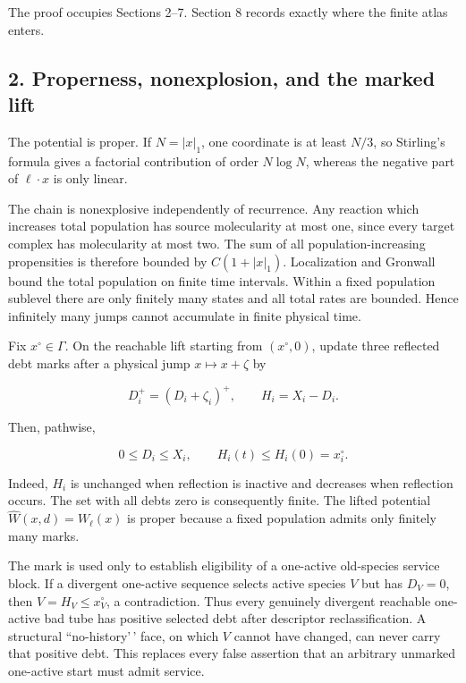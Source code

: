 The proof occupies Sections 2--7. Section 8 records exactly where the
finite atlas enters.

\subsection{2. Properness, nonexplosion, and the marked
lift}

The potential is proper. If \(N=|x|_1\), one coordinate is at least
\(N/3\), so Stirling's formula gives a factorial contribution of order
\(N\log N\), whereas the negative part of \(\ell\cdot x\) is only
linear.

The chain is nonexplosive independently of recurrence. Any reaction
which increases total population has source molecularity at most one,
since every target complex has molecularity at most two. The sum of all
population-increasing propensities is therefore bounded by
\(C(1+|x|_1)\). Localization and Gronwall bound the total population on
finite time intervals. Within a fixed population sublevel there are only
finitely many states and all total rates are bounded. Hence infinitely
many jumps cannot accumulate in finite physical time.

Fix \(x^\circ\in\Gamma\). On the reachable lift starting from
\((x^\circ,0)\), update three reflected debt marks after a physical jump
\(x\mapsto x+\zeta\) by

\[
 D_i^+=(D_i+\zeta_i)^+,
 \qquad H_i=X_i-D_i.                                  \tag{2.1}
\]

Then, pathwise,

\[
 0\le D_i\le X_i,
 \qquad H_i(t)\le H_i(0)=x_i^\circ.                  \tag{2.2}
\]

Indeed, \(H_i\) is unchanged when reflection is inactive and decreases
when reflection occurs. The set with all debts zero is consequently
finite. The lifted potential \(\widehat W(x,d)=W_\ell(x)\) is proper
because a fixed population admits only finitely many marks.

The mark is used only to establish eligibility of a one-active
old-species service block. If a divergent one-active sequence selects
active species \(V\) but has \(D_V=0\), then \(V=H_V\le x_V^\circ\), a
contradiction. Thus every genuinely divergent reachable one-active bad
tube has positive selected debt after descriptor reclassification. A
structural ``no-history'\,' face, on which \(V\) cannot have changed,
can never carry that positive debt. This replaces every false assertion
that an arbitrary unmarked one-active start must admit service.

